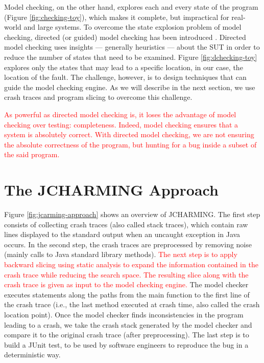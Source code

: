 \documentclass[times, doublespace]{smrauth}
\newcommand{\red}[1]{\textcolor{red}{#1}}
\begin{document}
Model checking, on the other hand, explores each and every state of the program
(Figure \ref{fig:checking-toy}), which makes it complete, but impractical for
real-world and large systems. To overcome the state explosion problem of
model checking, directed (or guided) model checking has been introduced
\cite{Edelkamp2004, Edelkamp2009}. Directed model checking uses insights --- generally
heuristics --- about the SUT in order to reduce the number of states
that need to be examined. Figure \ref{fig:dchecking-toy} explores only
the states that may lead to a specific location, in our case, the
location of the fault. The challenge, however, is to design techniques that
can guide the model checking engine. As we will describe in the next section,
we use crash traces and program slicing to overcome this challenge.

\red{As powerful as directed model checking is, it loses the advantage of model checking over testing: completeness.
Indeed, model checking ensures that a system is absolutely correct.
With directed model checking, we are not ensuring the absolute correctness of the program, but hunting for a bug inside a subset of the said program.}

\section{The JCHARMING Approach\label{sec:jcharming}}

Figure \ref{fig:jcarming-approach} shows an overview of JCHARMING. The first step
consists of collecting crash traces (also called stack traces), which contain raw lines
displayed to the standard output when an uncaught exception
in Java occurs. In the second step, the crash traces are
preprocessed by removing noise (mainly calls to Java standard
library methods). \red{The next step is to apply backward slicing
using static analysis to expand the information contained in
the crash trace while reducing the search space. The resulting
slice along with the crash trace is given as input to the model
checking engine.} The model checker executes statements
along the paths from the main function to the first line of the
crash trace (i.e., the last method executed at crash time, also
called the crash location point). Once the model checker finds
inconsistencies in the program leading to a crash, we take the
crash stack generated by the model checker and compare it to
the original crash trace (after preprocessing). The last step is
to build a JUnit test, to be used by software engineers to
reproduce the bug in a deterministic way.
\end{document}
